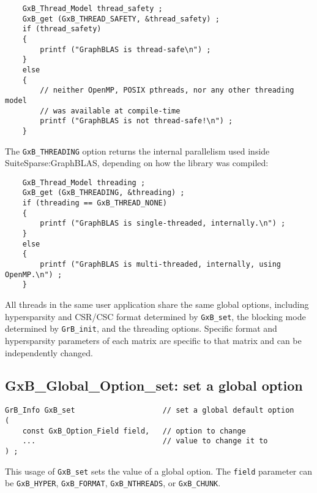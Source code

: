 \documentclass[12pt]{article}
\begin{document}
{\footnotesize
\begin{verbatim}
    GxB_Thread_Model thread_safety ;
    GxB_get (GxB_THREAD_SAFETY, &thread_safety) ;
    if (thread_safety)
    {
        printf ("GraphBLAS is thread-safe\n") ;
    }
    else
    {
        // neither OpenMP, POSIX pthreads, nor any other threading model
        // was available at compile-time
        printf ("GraphBLAS is not thread-safe!\n") ;
    }
\end{verbatim} }

The \verb'GxB_THREADING' option returns the internal parallelism used inside
SuiteSparse:GraphBLAS, depending on how the library was compiled:

\newpage
{\footnotesize
\begin{verbatim}
    GxB_Thread_Model threading ;
    GxB_get (GxB_THREADING, &threading) ;
    if (threading == GxB_THREAD_NONE)
    {
        printf ("GraphBLAS is single-threaded, internally.\n") ;
    }
    else
    {
        printf ("GraphBLAS is multi-threaded, internally, using OpenMP.\n") ;
    }
\end{verbatim} }

All threads in the same user application share the same global options,
including hypersparsity and CSR/CSC format determined by \verb'GxB_set', the
blocking mode determined by \verb'GrB_init', and the threading options.
Specific format and hypersparsity parameters of each matrix are specific to
that matrix and can be independently changed.

\newpage
\subsection{{\sf GxB\_Global\_Option\_set:} set a global option}

\begin{mdframed}[userdefinedwidth=6in]
{\footnotesize
\begin{verbatim}
GrB_Info GxB_set                    // set a global default option
(
    const GxB_Option_Field field,   // option to change
    ...                             // value to change it to
) ;
\end{verbatim} } \end{mdframed}

This usage of \verb'GxB_set' sets the value of a global option.
The \verb'field' parameter can be \verb'GxB_HYPER', \verb'GxB_FORMAT',
\verb'GxB_NTHREADS', or \verb'GxB_CHUNK'.
\end{document}
